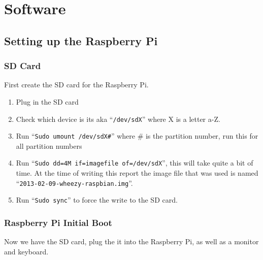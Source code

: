 \documentclass{article}
\begin{document}
\section{Software}
\subsection{Setting up the Raspberry Pi}
\subsubsection{SD Card}
First create the SD card for the Raspberry Pi.

\begin{enumerate}
    \item Plug in the SD card
    \item Check which device is its aka ``{\tt /dev/sdX}'' where X is a letter a-Z.
    \item Run ``{\tt Sudo umount /dev/sdX\#}'' where \# is the partition number, run this for all partition numbers
    \item Run ``{\tt Sudo dd=4M if=imagefile of=/dev/sdX}'', this will take quite a bit of time. At the time of writing this report the image file that was used is named ``{\tt 2013-02-09-wheezy-raspbian.img}''.
    \item Run ``{\tt Sudo sync}'' to force the write to the SD card.
\end{enumerate}

\subsubsection{Raspberry Pi Initial Boot}
Now we have the SD card, plug the it into the Raspberry Pi, as well as a monitor and keyboard.
\end{document}

